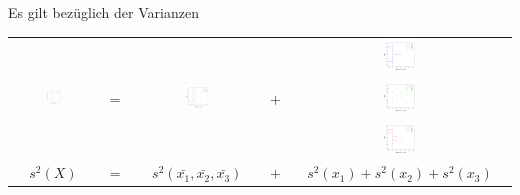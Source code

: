\begin{frame}
  {Es gilt bezüglich der Varianzen}

  \begin{center}
    \begin{tabular}[h!]{ccccc}
      \multirow{3}{*}{\includegraphics[width=0.2\textwidth]{graphics/anova_var_total}} & \multirow{3}{*}{$=$} & \multirow{3}{*}{\includegraphics[width=0.2\textwidth]{graphics/anova_var_between}} & \multirow{3}{*}{$+$} & \includegraphics[width=0.15\textwidth]{graphics/anova_var_x1} \\
      &&&& \includegraphics[width=0.15\textwidth]{graphics/anova_var_x2} \\
      &&&& \includegraphics[width=0.15\textwidth]{graphics/anova_var_x3} \\
      \hline
      $s^2(X)$ & $=$ & $s^2(\bar{x_1},\bar{x_2},\bar{x_3})$ & $+$ & $s^2(x_1)+s^2(x_2)+s^2(x_3)$ \\
    \end{tabular}\\
    \Zeile
  \end{center}
\end{frame}

